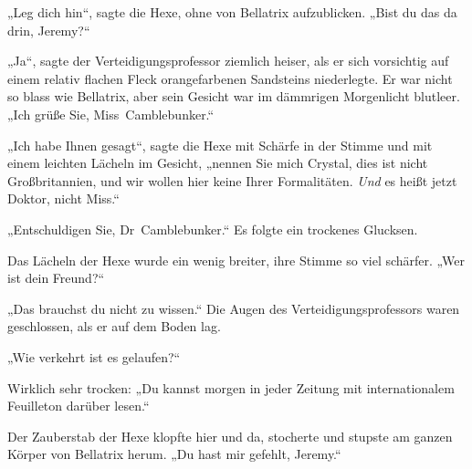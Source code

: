 „Leg dich hin“, sagte die Hexe, ohne von Bellatrix aufzublicken.
„Bist du das da drin, Jeremy?“

„Ja“, sagte der Verteidigungsprofessor ziemlich heiser, als er sich vorsichtig auf einem relativ flachen Fleck orangefarbenen Sandsteins niederlegte. Er war nicht so blass wie Bellatrix, aber sein Gesicht war im dämmrigen Morgenlicht blutleer.
„Ich grüße Sie, Miss~Camblebunker.“

„Ich habe Ihnen gesagt“, sagte die Hexe mit Schärfe in der Stimme und mit einem leichten Lächeln im Gesicht, „nennen Sie mich Crystal, dies ist nicht Großbritannien, und wir wollen hier keine Ihrer Formalitäten. \emph{Und} es heißt jetzt Doktor, nicht Miss.“

„Entschuldigen Sie, Dr~Camblebunker.“ Es folgte ein trockenes Glucksen.

Das Lächeln der Hexe wurde ein wenig breiter, ihre Stimme so viel schärfer.
„Wer ist dein Freund?“

„Das brauchst du nicht zu wissen.“ Die Augen des Verteidigungsprofessors waren geschlossen, als er auf dem Boden lag.

„Wie verkehrt ist es gelaufen?“

Wirklich sehr trocken:
„Du kannst morgen in jeder Zeitung mit internationalem Feuilleton darüber lesen.“

Der Zauberstab der Hexe klopfte hier und da, stocherte und stupste am ganzen Körper von Bellatrix herum.
„Du hast mir gefehlt, Jeremy.“

